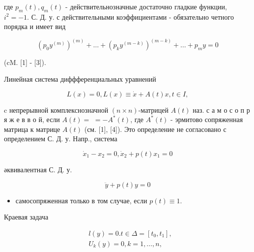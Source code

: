 \documentclass[10pt]{article}
\begin{document}
где $p_{m}(t), q_{m}(t)$ - действительнозначные достаточно гладкие функции, $i^{2}=-1$. С. Д. у. с действительными коэффициентами - обязательно четного порядка и имеет вид



\[

\left(p_{0} y^{(m)}\right)^{(m)}+\ldots+\left(p_{k} y^{(m-k)}\right)^{(m-k)}+\ldots+p_{m} y=0

\]



(cM. [1] - [3]).



Линейная система диффференциальных уравнений



\[

L(x)=0, L(x) \equiv \dot{x}+A(t) x, t \in I,

\]



c непрерывной комплекснозначной $(n \times n)$-матрицей $A(t)$ наз. с а м о с о п р я ж е в в о й, если $A(t)=$ $=-A^{*}(t)$, где $A^{*}(t)$ - эрмитово сопряженная матрица к матрице $A(t)$ (см. [1], [4]). Это определение не согласовано с определением С. Д. у. Напр., система



\[

\dot{x}_{1}-x_{2}=0, \dot{x}_{2}+p(t) x_{1}=0

\]



әквивалентная С. Д. у.



\[

\ddot{y}+p(t) y=0

\]



\begin{itemize}

  \item самосопряженная только в том случае, если $p(t) \equiv 1$.

\end{itemize}



Краевая задача



\[

\begin{aligned}

& l(y)=0 . t \in \Delta=\left[t_{0}, t_{1}\right], \\

& U_{k}(y)=0, k=1, \ldots, n,

\end{aligned}

\]
\end{document}
